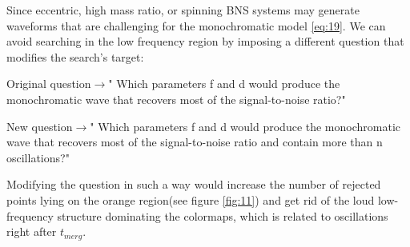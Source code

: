 \FloatBarrier



Since eccentric, high mass ratio, or spinning BNS systems may generate waveforms that are challenging for the monochromatic model \ref{eq:19}. We can avoid searching in the low frequency region by imposing a different question  that modifies the search's target:

Original question$\rightarrow$" Which parameters f and d would produce the monochromatic wave that recovers most of the signal-to-noise ratio?"

New question$\rightarrow$" Which parameters f and d would produce the monochromatic wave that recovers most of the signal-to-noise ratio and contain more than n oscillations?"


Modifying the question in such a way would increase the number of rejected points lying on the orange region(see figure \ref{fig:11}) and get rid of the loud low-frequency structure dominating the colormaps, which is related to oscillations right after $t_{merg}$.


